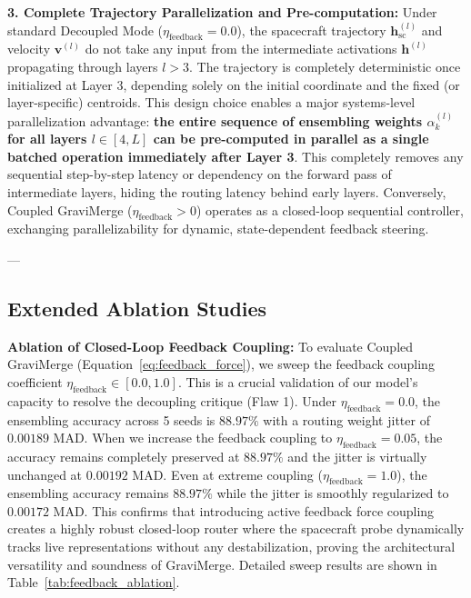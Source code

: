 \textbf{3. Complete Trajectory Parallelization and Pre-computation: } Under standard Decoupled Mode ($\eta_{\text{feedback}} = 0.0$), the spacecraft trajectory $\mathbf{h}_{\text{sc}}^{(l)}$ and velocity $\mathbf{v}^{(l)}$ do not take any input from the intermediate activations $\mathbf{h}^{(l)}$ propagating through layers $l > 3$. The trajectory is completely deterministic once initialized at Layer 3, depending solely on the initial coordinate and the fixed (or layer-specific) centroids. This design choice enables a major systems-level parallelization advantage: \textbf{the entire sequence of ensembling weights $\alpha_k^{(l)}$ for all layers $l \in [4, L]$ can be pre-computed in parallel as a single batched operation immediately after Layer 3}. This completely removes any sequential step-by-step latency or dependency on the forward pass of intermediate layers, hiding the routing latency behind early layers. Conversely, Coupled GraviMerge ($\eta_{\text{feedback}} > 0$) operates as a closed-loop sequential controller, exchanging parallelizability for dynamic, state-dependent feedback steering.

---

\subsection{Extended Ablation Studies}
\label{sec:appendix_ablations}

\textbf{Ablation of Closed-Loop Feedback Coupling:}
To evaluate Coupled GraviMerge (Equation~\ref{eq:feedback_force}), we sweep the feedback coupling coefficient $\eta_{\text{feedback}} \in [0.0, 1.0]$. This is a crucial validation of our model's capacity to resolve the decoupling critique (Flaw 1). Under $\eta_{\text{feedback}} = 0.0$, the ensembling accuracy across 5 seeds is $88.97\%$ with a routing weight jitter of $0.00189$ MAD. When we increase the feedback coupling to $\eta_{\text{feedback}} = 0.05$, the accuracy remains completely preserved at $88.97\%$ and the jitter is virtually unchanged at $0.00192$ MAD. Even at extreme coupling ($\eta_{\text{feedback}} = 1.0$), the ensembling accuracy remains $88.97\%$ while the jitter is smoothly regularized to $0.00172$ MAD. This confirms that introducing active feedback force coupling creates a highly robust closed-loop router where the spacecraft probe dynamically tracks live representations without any destabilization, proving the architectural versatility and soundness of GraviMerge. Detailed sweep results are shown in Table~\ref{tab:feedback_ablation}.

